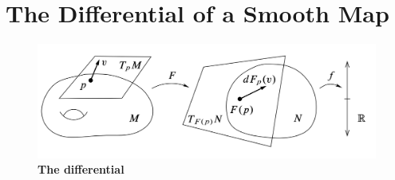 \documentclass[11pt]{article}
\begin{document}
\section{The Differential of a Smooth Map}
\begin{figure}
\begin{minipage}[t]{1\linewidth}
  \centering
  \centerline{\includegraphics[scale = 0.6]{differentials.png}}
\end{minipage}
\caption{\footnotesize{\textbf{The differential \citep{lee2003introduction}}}}
\label{fig: differentials}
\end{figure}
\end{document}

